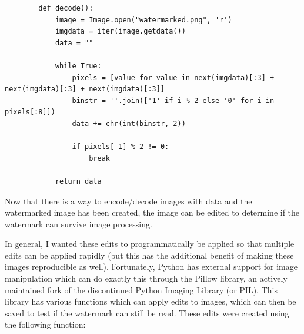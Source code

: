 \documentclass[titlepage]{article}
\begin{document}
        \begin{verbatim}
        def decode():
            image = Image.open("watermarked.png", 'r')
            imgdata = iter(image.getdata())
            data = ""
            
            while True:
                pixels = [value for value in next(imgdata)[:3] + next(imgdata)[:3] + next(imgdata)[:3]]
                binstr = ''.join(['1' if i % 2 else '0' for i in pixels[:8]])
                data += chr(int(binstr, 2))
                
                if pixels[-1] % 2 != 0:
                    break
            
            return data
        \end{verbatim}

        Now that there is a way to encode/decode images with data and the
        watermarked image has been created, the image can be edited to determine
        if the watermark can survive image processing.

        \vspace{0.5em}

        In general, I wanted these edits to programmatically be applied so that
        multiple edits can be applied rapidly (but this has the additional
        benefit of making these images reproducible as well). Fortunately,
        Python has external support for image manipulation which can do exactly
        this through the Pillow library, an actively maintained fork of the
        discontinued Python Imaging Library (or PIL). This library has various
        functions which can apply edits to images, which can then be saved to
        test if the watermark can still be read. These edits were created using
        the following function:
\end{document}
